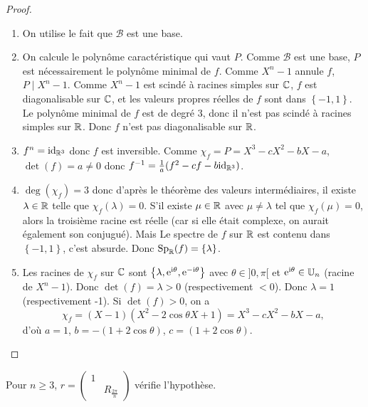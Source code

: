 \documentclass[12pt]{article}
\begin{document}
\begin{proof}
	\phantom{}
	\begin{enumerate}
		\item On utilise le fait que $\mathcal{B}$ est une base.
		\item On calcule le polynôme caractéristique qui vaut $P$. Comme $\mathcal{B}$ est une base, $P$ est nécessairement le polynôme minimal de $f$. Comme $X^{n}-1$ annule $f$, $P\mid X^{n}-1$. Comme $X^{n}-1$ est scindé à racines simples sur $\mathbb{C}$, $f$ est diagonalisable sur $\mathbb{C}$, et les valeurs propres réelles de $f$ sont dans $\left\lbrace-1,1\right\rbrace$. Le polynôme minimal de $f$ est de degré 3, donc il n'est pas scindé à racines simples sur $\mathbb{R}$. Donc $f$ n'est pas diagonalisable sur $\mathbb{R}$.
		\item $f^{n}=\mathrm{id}_{\mathbb{R}^{3}}$ donc $f$ est inversible. Comme $\chi_{f}=P=X^{3}-cX^{2}-bX-a$, $\det(f)=a\neq0$ donc $f^{-1}=\frac{1}{a}(f^{2}-cf-b\mathrm{id}_{\mathbb{R}^{3}})$.
		\item $\deg(\chi_{f})=3$ donc d'après le théorème des valeurs intermédiaires, il existe $\lambda\in\mathbb{R}$ telle que $\chi_{f}(\lambda)=0$. S'il existe $\mu\in\mathbb{R}$ avec $\mu\neq\lambda$ tel que $\chi_{f}(\mu)=0$, alors la troisième racine est réelle (car si elle était complexe, on aurait également son conjugué). Mais Le spectre de $f$ sur $\mathbb{R}$ est contenu dans $\left\lbrace-1,1\right\rbrace$, c'est absurde. Donc $\operatorname{Sp}_{\mathbb{R}}(f)=\left\lbrace\lambda\right\rbrace$.
		\item Les racines de $\chi_{f}$ sur $\mathbb{C}$ sont $\left\lbrace\lambda,\mathrm{e}^{\mathrm{i}\theta},\mathrm{e}^{-\mathrm{i}\theta}\right\rbrace$ avec $\theta\in]0,\pi[$ et $\mathrm{e}^{\mathrm{i}\theta}\in\mathbb{U}_{n}$ (racine de $X^{n}-1$). Donc $\det(f)=\lambda>0$ (respectivement $<0$). Donc $\lambda=1$ (respectivement -1). Si $\det(f)>0$, on a 
		\begin{equation*}
			\chi_{f}=(X-1)(X^{2}-2\cos\theta X+1)=X^{3}-cX^{2}-bX-a,
		\end{equation*}
		d'où $a=1$, $b=-(1+2\cos\theta)$, $c=(1+2\cos\theta)$.
	\end{enumerate}
\end{proof}

\begin{remark}
	Pour $n\geqslant3$, $r=\begin{pmatrix}
		1&\\&R_{\frac{2\pi}{n}}
	\end{pmatrix}$ vérifie l'hypothèse.
\end{remark}
\end{document}
